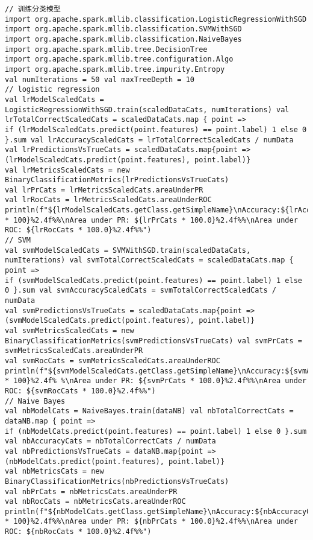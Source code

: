\begin{lstlisting}
// 训练分类模型
import org.apache.spark.mllib.classification.LogisticRegressionWithSGD import org.apache.spark.mllib.classification.SVMWithSGD
import org.apache.spark.mllib.classification.NaiveBayes
import org.apache.spark.mllib.tree.DecisionTree
import org.apache.spark.mllib.tree.configuration.Algo
import org.apache.spark.mllib.tree.impurity.Entropy
val numIterations = 50 val maxTreeDepth = 10
// logistic regression
val lrModelScaledCats = LogisticRegressionWithSGD.train(scaledDataCats, numIterations) val lrTotalCorrectScaledCats = scaledDataCats.map { point =>
if (lrModelScaledCats.predict(point.features) == point.label) 1 else 0 }.sum val lrAccuracyScaledCats = lrTotalCorrectScaledCats / numData
val lrPredictionsVsTrueCats = scaledDataCats.map{point =>
(lrModelScaledCats.predict(point.features), point.label)}
val lrMetricsScaledCats = new BinaryClassificationMetrics(lrPredictionsVsTrueCats)
val lrPrCats = lrMetricsScaledCats.areaUnderPR
val lrRocCats = lrMetricsScaledCats.areaUnderROC
println(f"${lrModelScaledCats.getClass.getSimpleName}\nAccuracy:${lrAccuracyScaledCats * 100}%2.4f%%\nArea under PR: ${lrPrCats * 100.0}%2.4f%%\nArea under ROC: ${lrRocCats * 100.0}%2.4f%%")
// SVM
val svmModelScaledCats = SVMWithSGD.train(scaledDataCats, numIterations) val svmTotalCorrectScaledCats = scaledDataCats.map { point =>
if (svmModelScaledCats.predict(point.features) == point.label) 1 else 0 }.sum val svmAccuracyScaledCats = svmTotalCorrectScaledCats / numData
val svmPredictionsVsTrueCats = scaledDataCats.map{point =>
(svmModelScaledCats.predict(point.features), point.label)}
val svmMetricsScaledCats = new BinaryClassificationMetrics(svmPredictionsVsTrueCats) val svmPrCats = svmMetricsScaledCats.areaUnderPR
val svmRocCats = svmMetricsScaledCats.areaUnderROC
println(f"${svmModelScaledCats.getClass.getSimpleName}\nAccuracy:${svmAccuracyScaledCats * 100}%2.4f% %\nArea under PR: ${svmPrCats * 100.0}%2.4f%%\nArea under ROC: ${svmRocCats * 100.0}%2.4f%%")
// Naive Bayes
val nbModelCats = NaiveBayes.train(dataNB) val nbTotalCorrectCats = dataNB.map { point =>
if (nbModelCats.predict(point.features) == point.label) 1 else 0 }.sum val nbAccuracyCats = nbTotalCorrectCats / numData
val nbPredictionsVsTrueCats = dataNB.map{point =>
(nbModelCats.predict(point.features), point.label)}
val nbMetricsCats = new BinaryClassificationMetrics(nbPredictionsVsTrueCats)
val nbPrCats = nbMetricsCats.areaUnderPR
val nbRocCats = nbMetricsCats.areaUnderROC
println(f"${nbModelCats.getClass.getSimpleName}\nAccuracy:${nbAccuracyCats * 100}%2.4f%%\nArea under PR: ${nbPrCats * 100.0}%2.4f%%\nArea under ROC: ${nbRocCats * 100.0}%2.4f%%")

\end{lstlisting}
